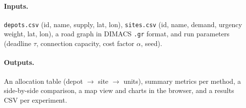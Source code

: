 \documentclass[11pt]{article}
\begin{document}
\paragraph{Inputs.}
\texttt{depots.csv} (id, name, supply, lat, lon), \texttt{sites.csv} (id,
name, demand, urgency weight, lat, lon), a road graph in DIMACS \texttt{.gr}
format, and run parameters (deadline $\tau$, connection capacity, cost
factor $\alpha$, seed).

\paragraph{Outputs.}
An allocation table (depot $\rightarrow$ site $\rightarrow$ units), summary
metrics per method, a side-by-side comparison, a map view and charts in
the browser, and a results CSV per experiment.
\end{document}
